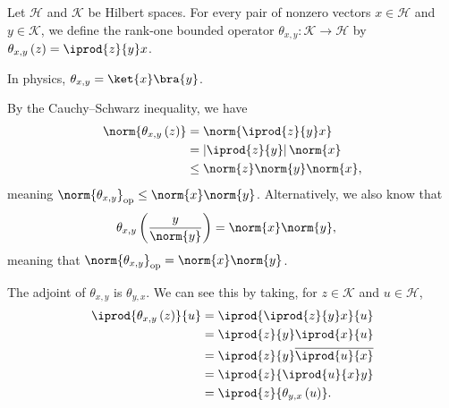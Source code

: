 \documentclass[10pt]{mypackage}
\begin{document}
\begin{example}
  Let $\mathcal{H}$ and $\mathcal{K}$ be Hilbert spaces. For every pair of nonzero vectors $x\in \mathcal{H}$ and $y\in \mathcal{K}$, we define the rank-one bounded operator $\theta_{x,y}: \mathcal{K}\rightarrow \mathcal{H}$ by $\theta_{x,y}\left(z\right) = \iprod{z}{y}x$.\newline

  In physics, $\theta_{x,y} = \ket{x}\bra{y}$.\newline

  By the Cauchy--Schwarz inequality, we have
  \begin{align*}
    \norm{\theta_{x,y}\left(z\right)} &= \norm{\iprod{z}{y}x}\\
                                      &= \left\vert \iprod{z}{y} \right\vert \norm{x}\\
                                      &\leq \norm{z}\norm{y}\norm{x},
  \end{align*}
  meaning $\norm{\theta_{x,y}}_{\text{op}} \leq \norm{x}\norm{y}$. Alternatively, we also know that
  \begin{align*}
    \theta_{x,y}\left(\frac{y}{\norm{y}}\right) &= \norm{x}\norm{y},
  \end{align*}
  meaning that $\norm{\theta_{x,y}}_{\text{op}} = \norm{x}\norm{y}$.\newline

  The adjoint of $\theta_{x,y}$ is $\theta_{y,x}$. We can see this by taking, for $z\in \mathcal{K}$ and $u\in \mathcal{H}$,
  \begin{align*}
    \iprod{\theta_{x,y}\left(z\right)}{u} &= \iprod{ \iprod{z}{y}x }{u}\\
                                          &= \iprod{z}{y} \iprod{x}{u}\\
                                          &= \iprod{z}{y} \overline{\iprod{u}{x}}\\
                                          &= \iprod{z}{ \iprod{u}{x}y }\\
                                          &= \iprod{z}{ \theta_{y,x}\left(u\right) }.
  \end{align*}
\end{example}
\end{document}
